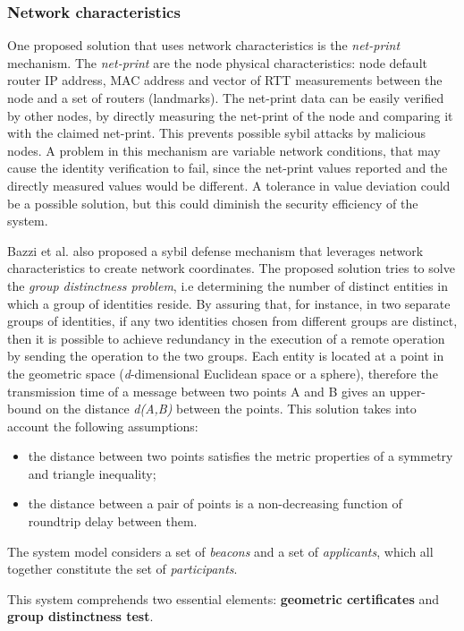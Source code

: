 \subsubsection{Network characteristics}
One proposed solution that uses network characteristics is the \textit{net-print}\cite{Wang2005} mechanism.
The \textit{net-print} are the node physical characteristics: node default router IP address, \acs{MAC} address and vector of \ac{RTT} measurements between the node and a set of routers (landmarks).
The net-print data can be easily verified by other nodes, by directly measuring the net-print of the node and comparing it with the claimed net-print.
This prevents possible sybil attacks by malicious nodes.
A problem in this mechanism are variable network conditions, that may cause the identity verification to fail, since the net-print values reported and the directly measured values would be different.
A tolerance in value deviation could be a possible solution, but this could diminish the security efficiency of the system.

Bazzi et al.\cite{Bazzi2005} also proposed a sybil defense mechanism that leverages network characteristics to create network coordinates.
The proposed solution tries to solve the \textit{group distinctness problem}, i.e determining the number of distinct entities in which a group of identities reside.
By assuring that, for instance, in two separate groups of identities, if any two identities chosen from different groups are distinct, then it is possible to achieve redundancy in the execution of a remote operation by sending the operation to the two groups.
Each entity is located at a point in the geometric space (\textit{d}-dimensional Euclidean space or a sphere), therefore the transmission time of a message between two points A and B gives an upper-bound on the distance \textit{d(A,B)} between the points.
This solution takes into account the following assumptions:
\begin{itemize}
	\item the distance between two points satisfies the metric properties of a symmetry and triangle inequality;
	\item the distance between a pair of points is a non-decreasing function of roundtrip delay between them.
\end{itemize}
The system model considers a set of \textit{beacons} and a set of \textit{applicants}, which all together constitute the set of \textit{participants}.

This system comprehends two essential elements: \textbf{geometric certificates} and \textbf{group distinctness test}.

